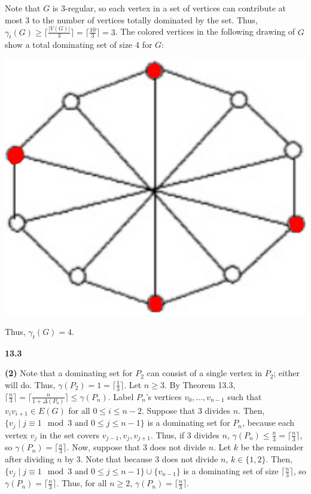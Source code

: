 \documentclass[12pt]{article}
\begin{document}
    Note that $G$ is 3-regular, so each vertex in a set of vertices can contribute at most 3 to the number of vertices totally dominated by the set.
    Thus, $\gamma_t(G) \geq \lceil\frac{|V(G)|}{3}\rceil = \lceil\frac{10}3\rceil = 3$.
    The colored vertices in the following drawing of $G$ show a total dominating set of size 4 for $G$:
    \begin{center} \includegraphics[scale=.4]{3.png} \end{center}
    Thus, $\gamma_t(G) = 4$.

\newpage\noindent\textbf{13.3}

\medskip\noindent\textbf{(2)}
    Note that a dominating set for $P_2$ can consist of a single vertex in $P_2$; either will do.
    Thus, $\gamma(P_2) = 1 = \lceil \frac 13 \rceil$.
    Let $n \geq 3$.
    By Theorem 13.3, $\lceil \frac n{3} \rceil = \lceil \frac n{1 + \Delta(P_n)} \rceil \leq \gamma(P_n)$.
    Label $P_n$'s vertices $v_0, \hdots, v_{n-1}$ such that $v_iv_{i+1} \in E(G)$ for all $0 \leq i \leq n - 2$.
    Suppose that 3 divides $n$.
    Then, $\{v_j \mid j \equiv 1 \mod 3 \text{ and } 0 \leq j \leq n - 1\}$ is a dominating set for $P_n$, because each vertex $v_j$ in the set covers $v_{j-1}, v_j, v_{j+1}$.
    Thus, if 3 divides $n$, $\gamma(P_n) \leq \frac n3 = \lceil \frac n3 \rceil$, so $\gamma(P_n) = \lceil \frac n3 \rceil$.
    Now, suppose that 3 does not divide $n$.
    Let $k$ be the remainder after dividing $n$ by 3.
    Note that because 3 does not divide $n$, $k \in \{1, 2\}$.
    Then, $\{v_j \mid j \equiv 1 \mod 3 \text{ and } 0 \leq j \leq n - 1\} \cup \{v_{n-1}\}$ is a dominating set of size $\lceil \frac n3 \rceil$, so $\gamma(P_n) = \lceil \frac n3 \rceil$.
    Thus, for all $n \geq 2$, $\gamma(P_n) = \lceil \frac n3 \rceil$.
\end{document}
